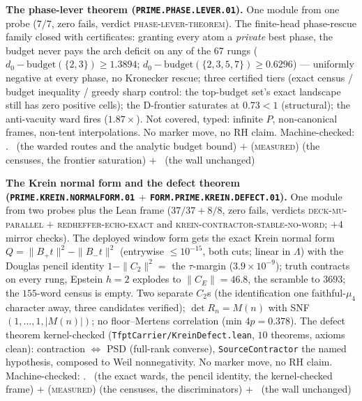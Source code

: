 \documentclass[11pt,a4paper]{article}
\theoremstyle{definition}
\begin{document}
\par\smallskip\noindent\textbf{The phase-lever theorem
(\texttt{PRIME.PHASE.\allowbreak LEVER.01}).}
One module from one probe ($7/7$, zero fails, verdict
\textsc{phase-lever-theorem}).  The finite-head phase-rescue
family closed with certificates: granting every atom a
\emph{private} best phase, the budget never pays the arch
deficit on any of the 67 rungs ($d_0 - \mathrm{budget}(\{2,3\})
\ge 1.3894$; $d_0 - \mathrm{budget}(\{2,3,5,7\}) \ge 0.6296$)
--- uniformly negative at every phase, no Kronecker rescue;
three certified tiers (exact census / budget inequality /
greedy sharp control: the top-budget set's exact landscape
still has zero positive cells); the D-frontier saturates at
$0.73 < 1$ (structural); the anti-vacuity ward fires
($1.87\times$).  Not covered, typed: infinite $P$,
non-canonical frames, non-tent interpolations.  No marker move,
no RH claim.
Machine-checked: .
\mE\ (the warded routes and the analytic budget bound) $+$
(\textsc{measured}) (the censuses, the frontier saturation)
$+$ \mO\ (the wall unchanged)
\par\smallskip

\par\smallskip\noindent\textbf{The Krein normal form and the
defect theorem
(\texttt{PRIME.KREIN.\allowbreak NORMALFORM.01} $+$
\texttt{FORM.PRIME.\allowbreak KREIN.\allowbreak DEFECT.01}).}
One module from two probes plus the Lean frame ($37/37 + 8/8$,
zero fails, verdicts \textsc{deck-mu-parallel} $+$
\textsc{redheffer-echo-exact} and
\textsc{krein-contractor-stable-no-word}; $+4$ mirror checks).
The deployed window form gets the exact Krein normal form
$Q = \|B_+t\|^2 - \|B_-t\|^2$ (entrywise $\le 10^{-15}$, both
cuts; linear in $\Lambda$) with the Douglas pencil identity
$1 - \|C_2\|^2 = $ the $\tau$-margin ($3.9\times10^{-9}$);
truth contracts on every rung, Epstein $h{=}2$ explodes to
$\|C_E\| = 46.8$, the scramble to $3693$; the $155$-word census
is empty.  Two separate $C_2$s (the identification one
faithful-$\mu_4$ character away, three candidates verified);
$\det R_n = M(n)$ with SNF $(1,\dots,1,|M(n)|)$; no
floor--Mertens correlation (min $4p = 0.378$).  The defect
theorem kernel-checked
(\texttt{TfptCarrier/KreinDefect.lean}, $10$ theorems, axioms
clean): contraction $\Leftrightarrow$ PSD (full-rank converse),
\texttt{SourceContractor} the named hypothesis, composed to
Weil nonnegativity.  No marker move, no RH claim.
Machine-checked: .
\mE\ (the exact wards, the pencil identity, the kernel-checked
frame) $+$ (\textsc{measured}) (the censuses, the
discriminators) $+$ \mO\ (the wall unchanged)
\par\smallskip
\end{document}
